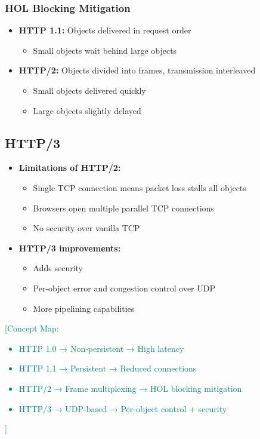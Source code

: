 \documentclass[12pt]{article}
\begin{document}
\subsubsection{HOL Blocking Mitigation}
\begin{itemize}
    \item \textbf{HTTP 1.1:} Objects delivered in request order
          \begin{itemize}
              \item Small objects wait behind large objects
          \end{itemize}
    \item \textbf{HTTP/2:} Objects divided into frames, transmission interleaved
          \begin{itemize}
              \item Small objects delivered quickly
              \item Large objects slightly delayed
          \end{itemize}
\end{itemize}

\subsection{HTTP/3}
\begin{itemize}
    \item \textbf{Limitations of HTTP/2:}
          \begin{itemize}
              \item Single TCP connection means packet loss stalls all objects
              \item Browsers open multiple parallel TCP connections
              \item No security over vanilla TCP
          \end{itemize}
    \item \textbf{HTTP/3 improvements:}
          \begin{itemize}
              \item Adds security
              \item Per-object error and congestion control over UDP
              \item More pipelining capabilities
          \end{itemize}
\end{itemize}

\textcolor{teal}{[Concept Map:
            \begin{itemize}
                \item HTTP 1.0 → Non-persistent → High latency
                \item HTTP 1.1 → Persistent → Reduced connections
                \item HTTP/2 → Frame multiplexing → HOL blocking mitigation
                \item HTTP/3 → UDP-based → Per-object control + security
            \end{itemize}
        ]}
\end{document}
